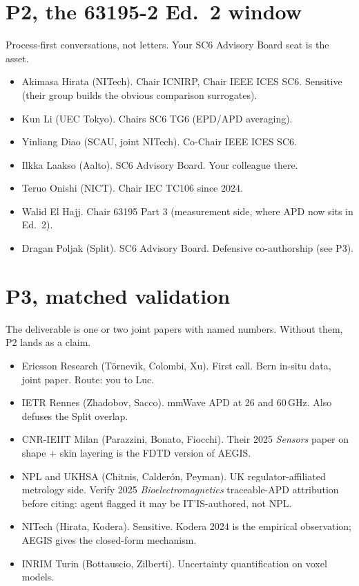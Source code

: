 \documentclass[11pt,a4paper]{article}
\begin{document}
\section{P2, the 63195-2 Ed.\ 2 window}
Process-first conversations, not letters. Your SC6 Advisory Board seat is the asset.
\begin{itemize}
  \item Akimasa Hirata (NITech). Chair ICNIRP, Chair IEEE ICES SC6. Sensitive (their group builds the obvious comparison surrogates).
  \item Kun Li (UEC Tokyo). Chairs SC6 TG6 (EPD/APD averaging).
  \item Yinliang Diao (SCAU, joint NITech). Co-Chair IEEE ICES SC6.
  \item Ilkka Laakso (Aalto). SC6 Advisory Board. Your colleague there.
  \item Teruo Onishi (NICT). Chair IEC TC106 since 2024.
  \item Walid El Hajj. Chair 63195 Part 3 (measurement side, where APD now sits in Ed.\ 2).
  \item Dragan Poljak (Split). SC6 Advisory Board. Defensive co-authorship (see P3).
\end{itemize}

\section{P3, matched validation}
The deliverable is one or two joint papers with named numbers. Without them, P2 lands as a claim.
\begin{itemize}
  \item Ericsson Research (T\"ornevik, Colombi, Xu). First call. Bern in-situ data, joint paper. Route: you to Luc.
  \item IETR Rennes (Zhadobov, Sacco). mmWave APD at 26 and 60\,GHz. Also defuses the Split overlap.
  \item CNR-IEIIT Milan (Parazzini, Bonato, Fiocchi). Their 2025 \emph{Sensors} paper on shape + skin layering is the FDTD version of AEGIS.
  \item NPL and UKHSA (Chitnis, Calder\'on, Peyman). UK regulator-affiliated metrology side. Verify 2025 \emph{Bioelectromagnetics} traceable-APD attribution before citing: agent flagged it may be IT'IS-authored, not NPL.
  \item NITech (Hirata, Kodera). Sensitive. Kodera 2024 is the empirical observation; AEGIS gives the closed-form mechanism.
  \item INRIM Turin (Bottauscio, Zilberti). Uncertainty quantification on voxel models.
\end{itemize}
\end{document}
